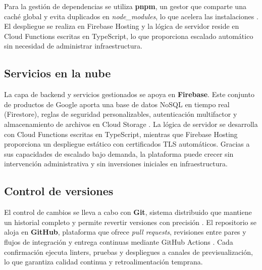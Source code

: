 \begin{large}
Para la gestión de dependencias se utiliza \textbf{pnpm}, un gestor que comparte una caché global y evita duplicados en \textit{node\_modules}, lo que acelera las instalaciones \cite{pnpm_docs2025}. El despliegue se realiza en Firebase Hosting y la lógica de servidor reside en Cloud Functions escritas en TypeScript, lo que proporciona escalado automático sin necesidad de administrar infraestructura.

\subsection*{Servicios en la nube}
La capa de backend y servicios gestionados se apoya en \textbf{Firebase}. Este conjunto de productos de Google aporta una base de datos NoSQL en tiempo real (Firestore), reglas de seguridad personalizables, autenticación multifactor y almacenamiento de archivos en Cloud Storage \cite{firebase_docs2025}. La lógica de servidor se desarrolla con Cloud Functions escritas en TypeScript, mientras que Firebase Hosting proporciona un despliegue estático con certificados TLS automáticos. Gracias a sus capacidades de escalado bajo demanda, la plataforma puede crecer sin intervención administrativa y sin inversiones iniciales en infraestructura.

\subsection*{Control de versiones}
El control de cambios se lleva a cabo con \textbf{Git}, sistema distribuido que mantiene un historial completo y permite revertir versiones con precisión \cite{git_book2023}. El repositorio se aloja en \textbf{GitHub}, plataforma que ofrece \textit{pull requests}, revisiones entre pares y flujos de integración y entrega continuas mediante GitHub Actions \cite{github_docs2025}. Cada confirmación ejecuta linters, pruebas y despliegues a canales de previsualización, lo que garantiza calidad continua y retroalimentación temprana.

\end{large}